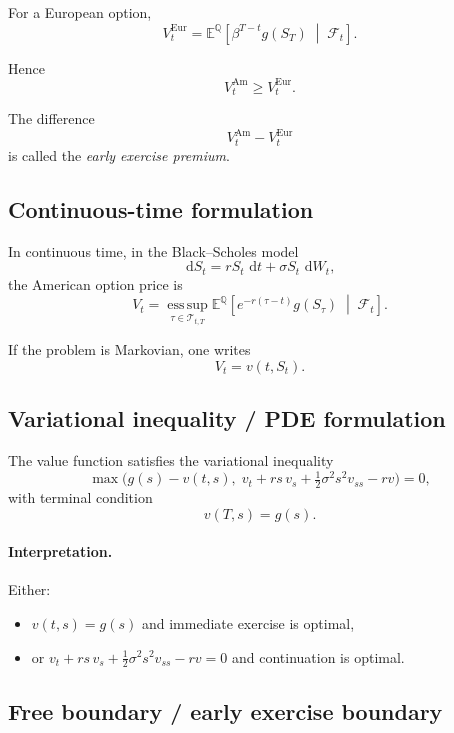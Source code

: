 \documentclass[11pt]{article}
\newcommand{\Qbb}{\mathbb{Q}}
\newcommand{\E}{\mathbb{E}}
\newcommand{\dd}{\,\mathrm{d}}
\newcommand{\1}{\mathbf{1}}
\theoremstyle{plain}
\theoremstyle{definition}
\theoremstyle{remark}
\begin{document}
For a European option,
\[
\boxed{
V_t^{\mathrm{Eur}}
=
\E^{\Qbb}\!\left[
\beta^{T-t}g(S_T)
\;\middle|\;
\mathcal{F}_t
\right].
}
\]

Hence
\[
\boxed{
V_t^{\mathrm{Am}}\ge V_t^{\mathrm{Eur}}.
}
\]

The difference
\[
V_t^{\mathrm{Am}}-V_t^{\mathrm{Eur}}
\]
is called the \emph{early exercise premium}.

\subsection{Continuous-time formulation}

In continuous time, in the Black--Scholes model
\[
\dd S_t=rS_t\,\dd t+\sigma S_t\,\dd W_t,
\]
the American option price is
\[
\boxed{
V_t
=
\operatorname*{ess\,sup}_{\tau\in\mathcal{T}_{t,T}}
\E^{\Qbb}\!\left[
e^{-r(\tau-t)}g(S_\tau)
\;\middle|\;
\mathcal{F}_t
\right].
}
\]

If the problem is Markovian, one writes
\[
V_t=v(t,S_t).
\]

\subsection{Variational inequality / PDE formulation}

The value function satisfies the variational inequality
\[
\boxed{
\max\!\big(g(s)-v(t,s),\; v_t + rs\,v_s + \tfrac12\sigma^2 s^2 v_{ss} - rv\big)=0,
}
\]
with terminal condition
\[
\boxed{
v(T,s)=g(s).
}
\]

\paragraph{Interpretation.}
Either:
\begin{itemize}[leftmargin=1.4em]
\item \(v(t,s)=g(s)\) and immediate exercise is optimal,
\item or \(v_t + rs\,v_s + \tfrac12\sigma^2 s^2 v_{ss} - rv=0\) and continuation is optimal.
\end{itemize}

\subsection{Free boundary / early exercise boundary}
\end{document}
